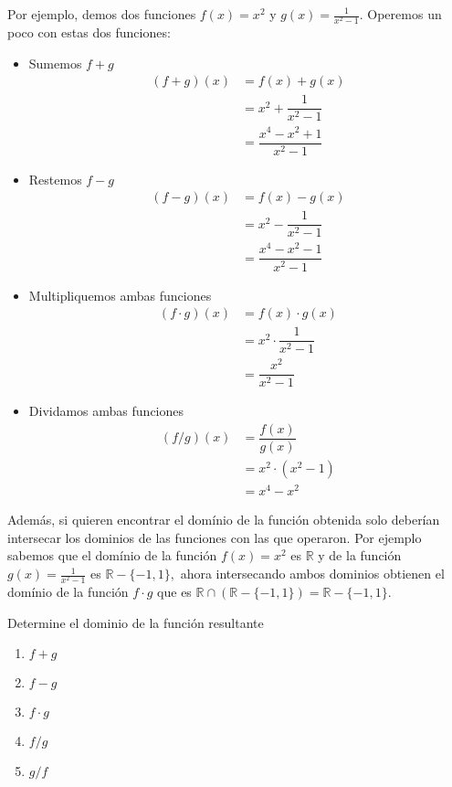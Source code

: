  Por ejemplo, demos dos funciones \(f(x)=x^2\) y \(g(x)=\frac{1}{x^2-1}.\) Operemos un poco con estas dos funciones:\\
 \begin{itemize}
 	\item Sumemos \(f+g\)
 	\begin{align*}
 		(f+g)(x)&=f(x)+g(x)\\
 		&=x^2+\dfrac{1}{x^2-1}\\
 		&=\dfrac{x^4-x^2+1}{x^2-1}
 	\end{align*}
 	
 	\item Restemos \(f-g\)
 	\begin{align*}
 		(f-g)(x)&=f(x)-g(x)\\
 		&=x^2-\dfrac{1}{x^2-1}\\
 		&=\dfrac{x^4-x^2-1}{x^2-1}
 	\end{align*}
 	
 	\item Multipliquemos ambas funciones
 	\begin{align*}
 		(f\cdot g)(x)&=f(x)\cdot g(x)\\
 		&=x^2\cdot\dfrac{1}{x^2-1}\\
 		&=\dfrac{x^2}{x^2-1}
 	\end{align*}
 	
 	\item Dividamos ambas funciones
 	\begin{align*}
 		(f/g)(x)&=\dfrac{f(x)}{g(x)}\\
 		&=x^2\cdot(x^2-1)\\
 		&=x^4-x^2
 	\end{align*}
 \end{itemize}
 Adem\'as, si quieren encontrar el dom\'inio de la funci\'on obtenida solo deber\'ian intersecar los dominios de las funciones con las que operaron. Por ejemplo sabemos que el dom\'inio de la funci\'on \(f(x)=x^2\) es \(\mathbb{R}\) y de la funci\'on \(g(x)=\frac{1}{x^2-1}\) es \(\mathbb{R}-\{-1,1\},\) ahora intersecando ambos dominios obtienen el dom\'inio de la funci\'on \(f\cdot g\) que es \(\mathbb{R}\cap\left(\mathbb{R}-\{-1,1\}\right)=\mathbb{R}-\{-1,1\}.\)\newline



\begin{exercise}
Determine el dominio de la funci\'on resultante

\begin{enumerate}
\item \(f+g\)
\item \(f-g\)
\item \(f\cdot g\)
\item \(f/g\)
\item \(g/f\)

\end{enumerate}

\end{exercise}

